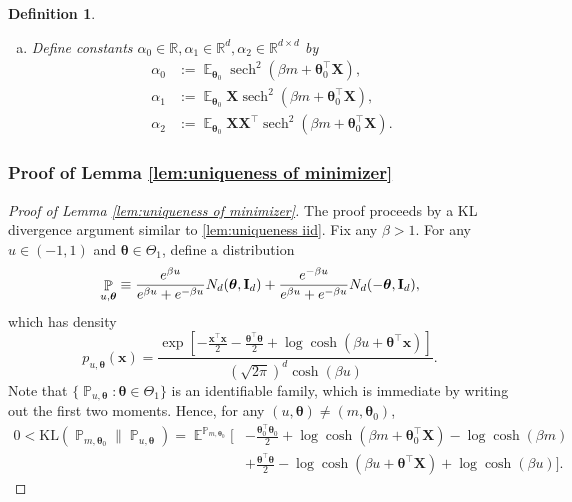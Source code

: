 \documentclass[preprint,reqno]{imsart}
\newtheorem{defi}{Definition}[section]
\newcommand{\ttheta}{\boldsymbol{\theta}}
\newcommand{\I}{\mathbf{I}_{\mathnormal{d}}}
\DeclareMathOperator{\sech}{sech}
\DeclareMathOperator{\EE}{\mathbb{E}}
\DeclareMathOperator{\PP}{\mathbb{P}}
\newcommand{\x}{\mathbf{x}}
\newcommand{\X}{\mathbf{X}}
\begin{document}
\begin{appendix}
\begin{defi}
\begin{enumerate}[(a),itemsep=2mm]
\item Define constants $\alpha_0 \in \mathbb{R}, \alpha_1 \in \mathbb{R}^d, \alpha_2 \in \mathbb{R}^{d\times d}$ by
\begin{align*}
    \alpha_0 &:= \EE_{\ttheta_0} \sech^2(\beta m + \ttheta_0^{\top} \X), \\
    \alpha_1 &:= \EE_{\ttheta_0} \X \sech^2(\beta m + \ttheta_0^{\top} \X), \\
    \alpha_2 &:= \EE_{\ttheta_0} \X \X^\top \sech^2(\beta m + \ttheta_0^{\top} \X).
\end{align*}
\end{enumerate}
\end{defi}

\subsubsection{Proof of Lemma \ref{lem:uniqueness of minimizer}}\label{subsec:uniqueness of low tmp minimizer proof}
\begin{proof}[Proof of Lemma \ref{lem:uniqueness of minimizer}]
The proof proceeds by a KL divergence argument similar to \cref{lem:uniqueness iid}. Fix any $\beta > 1$. For any $u \in (-1, 1)$ and $ \ttheta \in \Theta_1$, define a distribution $$\PP_{u, \ttheta} \equiv \frac{e^{\beta u}}{e^{\beta u}+e^{-\beta u}} N_d(\ttheta, \I) + \frac{e^{-\beta u}}{e^{\beta u}+e^{-\beta u}} N_d(-\ttheta, \I),$$ which has density $$p_{u, \ttheta}(\x) = \frac{\exp \left[ - \frac{\x^{\top} \x}{2} - \frac{\ttheta^\top \ttheta}{2} + \log \cosh(\beta u + \ttheta^{\top} \x) \right]}{(\sqrt{2\pi})^d \cosh(\beta u)}.$$
%
Note that $\{\PP_{u, \ttheta}: \ttheta\in \Theta_1 \}$ is an identifiable family, which is immediate by writing out the first two moments. Hence, for any $(u,\ttheta) \neq (m, \ttheta_0)$, 
\begin{align*}
    0 < \text{KL}(\PP_{m, \ttheta_0} \| \PP_{u, \ttheta}) = \EE^{\PP_{m, \ttheta_0}} \Big[&- \frac{\ttheta_0^\top \ttheta_0}{2} + \log \cosh(\beta m + \ttheta_0^{\top} \X) - \log \cosh(\beta m) \\
    & + \frac{\ttheta^\top \ttheta}{2}- \log \cosh(\beta u + \ttheta^{\top} \X)  + \log \cosh(\beta u) \Big].
\end{align*}
%
%
%
%
%
%
%
%
%


\end{proof}
\end{appendix}
\end{document}
